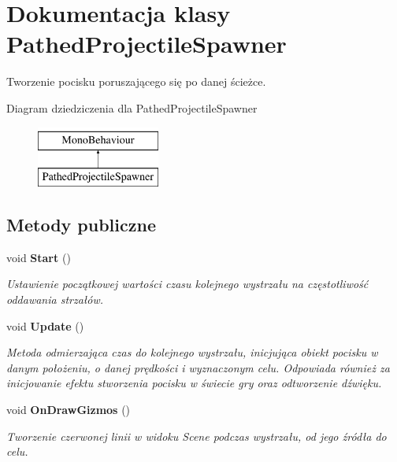 \section{Dokumentacja klasy Pathed\+Projectile\+Spawner}
\label{class_pathed_projectile_spawner}


Tworzenie pocisku poruszającego się po danej ścieżce.  


Diagram dziedziczenia dla Pathed\+Projectile\+Spawner\begin{figure}[H]
\begin{center}
\leavevmode
\includegraphics[height=2.000000cm]{class_pathed_projectile_spawner}
\end{center}
\end{figure}
\subsection*{Metody publiczne}
\begin{DoxyCompactItemize}
\item 
void {\bf Start} ()
\begin{DoxyCompactList}\small\item\em Ustawienie początkowej wartości czasu kolejnego wystrzału na częstotliwość oddawania strzałów. \end{DoxyCompactList}\item 
void {\bf Update} ()
\begin{DoxyCompactList}\small\item\em Metoda odmierzająca czas do kolejnego wystrzału, inicjująca obiekt pocisku w danym położeniu, o danej prędkości i wyznaczonym celu. Odpowiada również za inicjowanie efektu stworzenia pocisku w świecie gry oraz odtworzenie dźwięku. \end{DoxyCompactList}\item 
void {\bf On\+Draw\+Gizmos} ()
\begin{DoxyCompactList}\small\item\em Tworzenie czerwonej linii w widoku Scene podczas wystrzału, od jego źródła do celu. \end{DoxyCompactList}\end{DoxyCompactItemize}
